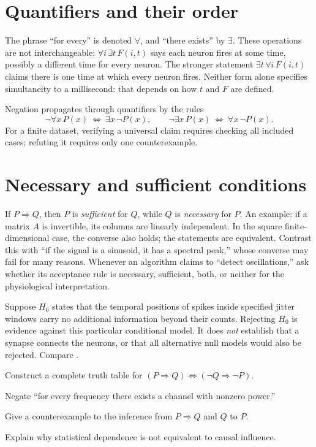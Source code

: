 \section{Quantifiers and their order}
The phrase ``for every'' is denoted $\forall$, and ``there exists'' by $\exists$. These operations are not interchangeable: $\forall i\,\exists t\,F(i,t)$ says each neuron fires at some time, possibly a different time for every neuron. The stronger statement $\exists t\,\forall i\,F(i,t)$ claims there is one time at which every neuron fires. Neither form alone specifies simultaneity to a millisecond: that depends on how $t$ and $F$ are defined.

Negation propagates through quantifiers by the rules
\[\neg\forall x\,P(x)\ \Leftrightarrow\ \exists x\,\neg P(x),\qquad
\neg\exists x\,P(x)\ \Leftrightarrow\ \forall x\,\neg P(x).\]
For a finite dataset, verifying a universal claim requires checking all included cases; refuting it requires only one counterexample.

\section{Necessary and sufficient conditions}
If $P\Rightarrow Q$, then $P$ is \emph{sufficient} for $Q$, while $Q$ is \emph{necessary} for $P$. An example: if a matrix $A$ is invertible, its columns are linearly independent. In the square finite-dimensional case, the converse also holds; the statements are equivalent. Contrast this with ``if the signal is a sinusoid, it has a spectral peak,'' whose converse may fail for many reasons. Whenever an algorithm claims to ``detect oscillations,'' ask whether its acceptance rule is necessary, sufficient, both, or neither for the physiological interpretation.

\begin{workedexample}
Suppose $H_0$ states that the temporal positions of spikes inside specified jitter windows carry no additional information beyond their counts. Rejecting $H_0$ is evidence against this particular conditional model. It does \emph{not} establish that a synapse connects the neurons, or that all alternative null models would also be rejected. Compare \cite{Amarasingham2012}.
\end{workedexample}
\begin{exercises}
\item Construct a complete truth table for $(P\Rightarrow Q)\Leftrightarrow(\neg Q\Rightarrow\neg P)$.
\item Negate ``for every frequency there exists a channel with nonzero power.''
\item Give a counterexample to the inference from $P\Rightarrow Q$ and $Q$ to $P$.
\item Explain why statistical dependence is not equivalent to causal influence.
\end{exercises}